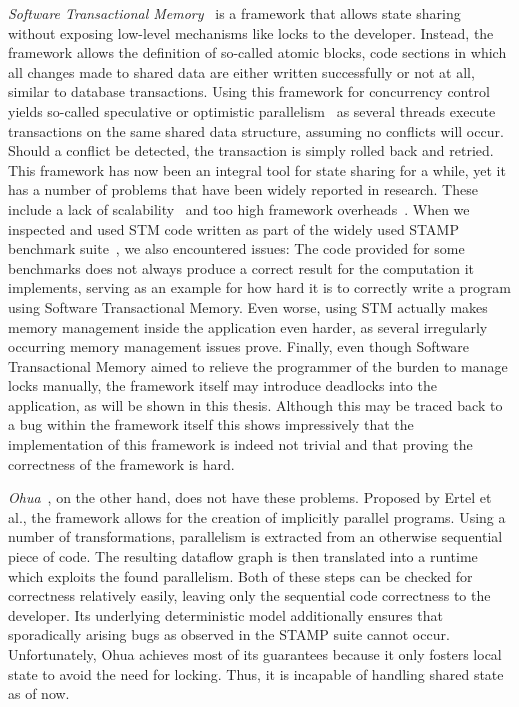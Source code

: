 \emph{Software Transactional Memory}~\cite{shavit1997software} is a framework that allows state sharing without exposing low-level mechanisms like locks to the developer.
Instead, the framework allows the definition of so-called atomic blocks, code sections in which all changes made to shared data are either written successfully or not at all, similar to database transactions.
Using this framework for concurrency control yields so-called speculative or optimistic parallelism~\cite{kulkarni2007optimistic} as several threads execute transactions on the same shared data structure, assuming no conflicts will occur.
Should a conflict be detected, the transaction is simply rolled back and retried.
This framework has now been an integral tool for state sharing for a while, yet it has a number of problems that have been widely reported in research.
These include a lack of scalability~\cite{perfumo2008limits} and too high framework overheads~\cite{cascaval2008software}.
When we inspected and used STM code written as part of the widely used STAMP benchmark suite~\cite{minh2008stamp}, we also encountered issues:
The code provided for some benchmarks does not always produce a correct result for the computation it implements, serving as an example for how hard it is to correctly write a program using Software Transactional Memory.
Even worse, using STM actually makes memory management inside the application even harder, as several irregularly occurring memory management issues prove.
Finally, even though Software Transactional Memory aimed to relieve the programmer of the burden to manage locks manually, the framework itself may introduce deadlocks into the application, as will be shown in this thesis.
Although this may be traced back to a bug within the framework itself this shows impressively that the implementation of this framework is indeed not trivial and that proving the correctness of the framework is hard.

\emph{Ohua}~\cite{ertel2015ohua}, on the other hand, does not have these problems.
Proposed by Ertel et al., the framework allows for the creation of implicitly parallel programs.
Using a number of transformations, parallelism is extracted from an otherwise sequential piece of code.
The resulting dataflow graph is then translated into a runtime which exploits the found parallelism.
Both of these steps can be checked for correctness relatively easily, leaving only the sequential code correctness to the developer.
Its underlying deterministic model additionally ensures that sporadically arising bugs as observed in the STAMP suite cannot occur.
Unfortunately, Ohua achieves most of its guarantees because it only fosters local state to avoid the need for locking.
Thus, it is incapable of handling shared state as of now.

